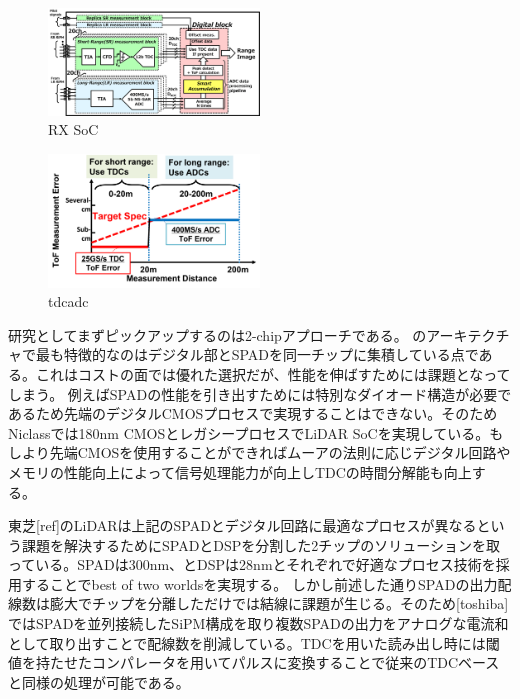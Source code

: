 \documentclass[letterpaper, 10 pt, conference]{ieeeconf}  %
\begin{document}
\begin{figure}[!t]
\centering
 \includegraphics[width=0.5\textwidth]{figs/toshibasoc.png}
  \caption{RX SoC\cite{yoshioka201820}}
\label{rxchip}
\end{figure}

\begin{figure}[!t]
\centering
 \includegraphics[width=0.5\textwidth]{figs/tdcadc.png}
  \caption{tdcadc}
\label{tdcadc}
\end{figure}

研究としてまずピックアップするのは2-chipアプローチである。
\cite{niclass2012100}のアーキテクチャで最も特徴的なのはデジタル部とSPADを同一チップに集積している点である。これはコストの面では優れた選択だが、性能を伸ばすためには課題となってしまう。
例えばSPADの性能を引き出すためには特別なダイオード構造が必要であるため先端のデジタルCMOSプロセスで実現することはできない。そのためNiclassでは180nm CMOSとレガシープロセスでLiDAR SoCを実現している。もしより先端CMOSを使用することができればムーアの法則に応じデジタル回路やメモリの性能向上によって信号処理能力が向上しTDCの時間分解能も向上する。

東芝[ref]のLiDARは上記のSPADとデジタル回路に最適なプロセスが異なるという課題を解決するためにSPADとDSPを分割した2チップのソリューションを取っている。SPADは300nm、とDSPは28nmとそれぞれで好適なプロセス技術を採用することでbest of two worldsを実現する。
しかし前述した通りSPADの出力配線数は膨大でチップを分離しただけでは結線に課題が生じる。そのため[toshiba]ではSPADを並列接続したSiPM構成を取り複数SPADの出力をアナログな電流和として取り出すことで配線数を削減している。TDCを用いた読み出し時には閾値を持たせたコンパレータを用いてパルスに変換することで従来のTDCベースと同様の処理が可能である。
\end{document}
